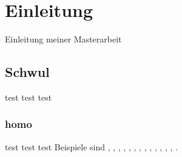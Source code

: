 \documentclass[Masterarbeit]{subfiles}
\begin{document}
\chapter{Einleitung}
Einleitung meiner Masterarbeit
\section{Schwul}
test test test
\subsection{homo}
test test test
Beispiele sind  \cite{Ko05a}, \cite{Ko05b}, \cite{MiGo05}, \cite{TeGo14}, \cite{HuHa07}, \cite{HuZi10}, \cite{ZiKu07}, \cite{He07}, \cite{SIE11}, \cite{SIE14}, \cite{ISO98}, \cite{ATM11}, \cite{Hu11}, \cite{Po10}.
\end{document}
